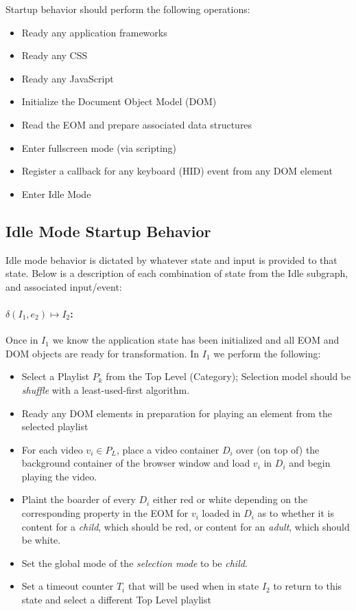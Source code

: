 \documentclass[10pt]{article}
\begin{document}
Startup behavior should perform the following operations: 

\begin{itemize}
	\item Ready any application frameworks
	\item Ready any CSS
	\item Ready any JavaScript
	\item Initialize the Document Object Model (DOM)
	\item Read the EOM and prepare associated data structures
	\item Enter fullscreen mode (via scripting)
	\item Register a callback for any keyboard (HID) event from any DOM element
	\item Enter Idle Mode
\end{itemize}

\subsection{Idle Mode Startup Behavior}

Idle mode behavior is dictated by whatever state and input is provided to that state. Below is a description of each combination of state from the Idle subgraph, and associated input/event:

\paragraph{$\delta(I_{1}, e_{2}) \mapsto I_{2}$:} 

Once in $I_{1}$ we know the application state has been initialized and all EOM and DOM objects are ready for transformation. In $I_{1}$ we perform the following: 

\begin{itemize}
	\item Select a Playlist $P_{k}$ from the Top Level (Category); Selection model should be \emph{shuffle} with a least-used-first algorithm.
	\item Ready any DOM elements in preparation for playing an element from the selected playlist
	\item For each video $v_{i} \in P_{L}$, place a video container $D_{i}$ over (on top of) the background container of the browser window and load $v_{i}$ in $D_{i}$ and begin playing the video.
	\item Plaint the boarder of every $D_{i}$ either red or white depending on the corresponding property in the EOM for $v_{i}$ loaded in $D_{i}$ as to whether it is content for a \emph{child\/}, which should be red, or content for an \emph{adult\/}, which should be white.
	\item Set the global mode of the \emph{selection mode\/} to be \emph{child}.
	\item Set a timeout counter $T_{i}$ that will be used when in state $I_{2}$ to return to this state and select a different Top Level playlist
\end{itemize}
\end{document}
